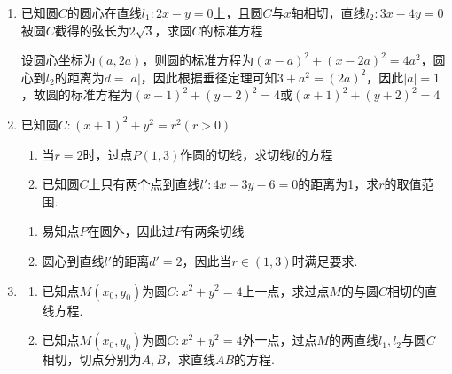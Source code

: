 \begin{enumerate}
\begin{jieda}
\begin{enumerate}
            圆心到直线 ${kx} - y + 2 - k = 0$ 的距离为$\dfrac{\left| k + 2 - k\right| }{\sqrt{1 + {k}^{2}}} = \dfrac{2}{\sqrt{1 + {k}^{2}}} \leq  2 < 3$ ,所以直线与圆相交.
        \end{enumerate}
    \end{jieda}
    \item 已知圆$C$的圆心在直线$l_1: 2x-y=0$上，且圆$C$与$x$轴相切，直线$l_2: 3x-4y=0$被圆$C$截得的弦长为$2\sqrt{3}$，求圆$C$的标准方程
    \begin{jieda}
        设圆心坐标为$(a, 2a)$，则圆的标准方程为$(x-a)^2+(x-2a)^2 = 4a^2$，圆心到$l_2$的距离为$d = |a|$，因此根据垂径定理可知$3+a^2 = (2a)^2$，因此$|a| = 1$，故圆的标准方程为$(x-1)^2+(y-2)^2 = 4$或$(x+1)^2+(y+2)^2 = 4$
    \end{jieda}
    \item 已知圆$C:(x+1)^2+y^2=r^2 (r>0)$
    \begin{enumerate}
        \item 当$r = 2$时，过点$P(1, 3)$作圆的切线，求切线$l$的方程
        \item 已知圆$C$上只有两个点到直线$l': 4x-3y-6 = 0$的距离为1，求$r$的取值范围.
    \end{enumerate}
    \begin{jieda}
        \begin{enumerate}
            \item 易知点$P$在圆外，因此过$P$有两条切线
            \item 圆心到直线$l'$的距离$d' = 2$，因此当$r \in (1, 3)$时满足要求.
        \end{enumerate}
    \end{jieda}
    \item 
    \begin{enumerate}
        \item 已知点$M(x_0, y_0)$为圆$C: x^2+y^2 = 4$上一点，求过点$M$的与圆$C$相切的直线方程.
        \item 已知点$M(x_0, y_0)$为圆$C: x^2+y^2 = 4$外一点，过点$M$的两直线$l_1, l_2$与圆$C$相切，切点分别为$A, B$，求直线$AB$的方程.

\end{enumerate}
\end{enumerate}
